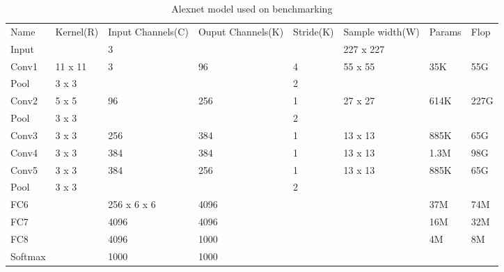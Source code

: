 \begin{table*}[]
\centering
\caption{Alexnet model used on benchmarking}
\label{alex_model}
\begin{tabular}{llllllll}
Name    & Kernel(R) & Input Channels(C) & Ouput Channels(K) & Stride(K) & Sample width(W) & Params & Flop \\
Input   &           & 3                 &                   &           & 227 x 227       &        &      \\
Conv1   & 11 x 11   & 3                 & 96                & 4         & 55 x 55         & 35K    & 55G  \\
Pool    & 3 x 3     &                   &                   & 2         &                 &        &      \\
Conv2   & 5 x 5     & 96                & 256               & 1         & 27 x 27         & 614K   & 227G \\
Pool    & 3 x 3     &                   &                   & 2         &                 &        &      \\
Conv3   & 3 x 3     & 256               & 384               & 1         & 13 x 13         & 885K   & 65G  \\
Conv4   & 3 x 3     & 384               & 384               & 1         & 13 x 13         & 1.3M   & 98G  \\
Conv5   & 3 x 3     & 384               & 256               & 1         & 13 x 13         & 885K   & 65G  \\
Pool    & 3 x 3     &                   &                   & 2         &                 &        &      \\
FC6     &           & 256 x 6 x 6       & 4096              &           &                 & 37M    & 74M  \\
FC7     &           & 4096              & 4096              &           &                 & 16M    & 32M  \\
FC8     &           & 4096              & 1000              &           &                 & 4M     & 8M   \\
Softmax &           & 1000              & 1000              &           &                 &        &     
\end{tabular}
\end{table*}

